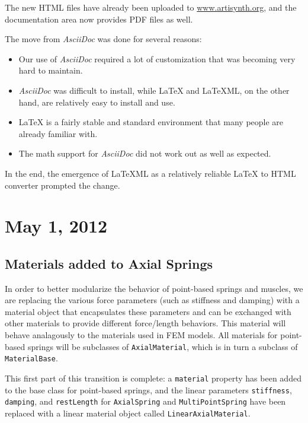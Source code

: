 \documentclass{article}
\begin{document}
The new HTML files have already been uploaded to
\href{http://www.artisynth.org}{www.artisynth.org}, and the
documentation area now provides PDF files as well.

The move from {\it AsciiDoc} was done for several reasons:

\begin{itemize}

\item Our use of {\it AsciiDoc} required a lot of customization
that was becoming very hard to maintain.

\item {\it AsciiDoc} was difficult to install, while LaTeX and
LaTeXML, on the other hand, are relatively easy to install and use.

\item LaTeX is a fairly stable and standard environment that many
people are already familiar with.

\item The math support for {\it AsciiDoc} did not work out as well as
expected.

\end{itemize}

In the end, the emergence of LaTeXML as a relatively reliable LaTeX to
HTML converter prompted the change.

\section*{May 1, 2012}

\subsection*{Materials added to Axial Springs}

In order to better modularize the behavior of point-based springs and
muscles, we are replacing the various force parameters (such as
stiffness and damping) with a material object that encapsulates these
parameters and can be exchanged with other materials to provide
different force/length behaviors. This material will behave
analagously to the materials used in FEM models. All materials for
point-based springs will be subclasses of {\tt AxialMaterial}, which is in
turn a subclass of {\tt MaterialBase}.

This first part of this transition is complete: a {\tt material} property
has been added to the base class for point-based springs, and the
linear parameters {\tt stiffness}, {\tt damping}, and {\tt restLength} for
{\tt AxialSpring} and {\tt MultiPointSpring} have been replaced with a linear
material object called {\tt LinearAxialMaterial}.
\end{document}
